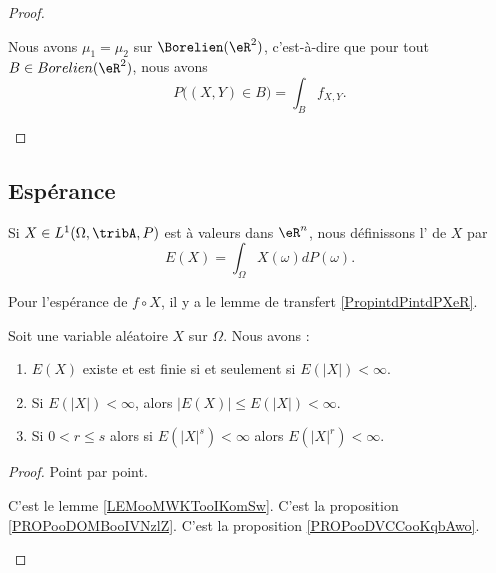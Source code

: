 \begin{proof}
\begin{subproof}
		\spitem[Conclusion]
		Nous avons \( \mu_1=\mu_2\) sur \( \Borelien(\eR^2)\), c'est-à-dire que pour tout \( B\in Borelien(\eR^2)\), nous avons
		\begin{equation}
			P\big( (X,Y)\in B \big)=\int_Bf_{X,Y}.
		\end{equation}
	\end{subproof}
\end{proof}

\subsection{Espérance}

\begin{definition}      \label{DEFooQKFBooCBZtRG}
	Si \( X\in L^1(\Omega,\tribA,P)\) est à valeurs dans \( \eR^n\), nous définissons l' de \( X\) par
	\begin{equation}        \label{EqdCBLst}
		E(X)=\int_{\Omega}X(\omega)dP(\omega).
	\end{equation}
\end{definition}

Pour l'espérance de \( f\circ X\), il y a le lemme de transfert \ref{PropintdPintdPXeR}.

\begin{proposition}		\label{PROPooESPWooAfLmeW}
	Soit une variable aléatoire \( X\) sur \( \Omega\). Nous avons :
	\begin{enumerate}
		\item		\label{ITEMooWSJVooAlZSBZ}
		      \( E(X)\) existe et est finie si et seulement si \( E(| X |)<\infty\).
		\item		\label{ITEMooLDFWooXjyZyz}
		      Si \( E(| X |)<\infty\), alors \( | E(X) |\leq E(| X |)<\infty\).
		\item		\label{ITEMooFJCTooEBeFaz}
		      Si \( 0<r\leq s\) alors si \( E(| X |^s)<\infty\) alors \( E(| X |^r)<\infty\).
	\end{enumerate}
\end{proposition}

\begin{proof}
	Point par point.
	\begin{subproof}
		C'est le lemme \ref{LEMooMWKTooIKomSw}.
		C'est la proposition \ref{PROPooDOMBooIVNzlZ}.
		C'est la proposition \ref{PROPooDVCCooKqbAwo}.
	\end{subproof}
\end{proof}


